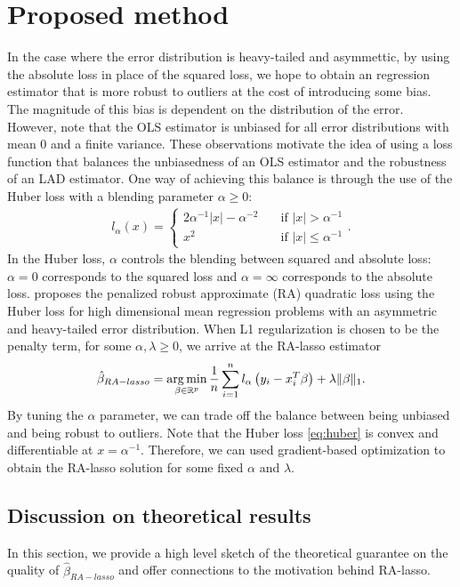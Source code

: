 

\section{Proposed method}\label{sec:method}
In the case where the error distribution is heavy-tailed and asymmettic, by using the absolute loss in place of the squared loss, we hope to obtain an regression estimator that is more robust to outliers at the cost of introducing some bias. The magnitude of this bias is dependent on the distribution of the error. However, note that the OLS estimator is unbiased for all error distributions with mean $0$ and a finite variance. These observations motivate the idea of using a loss function that balances the unbiasedness of an OLS estimator and the robustness of an LAD estimator. One way of achieving this balance is through the use of the Huber loss with a blending parameter $\alpha \geq 0$:
\begin{align}
l_\alpha(x) = 
\begin{cases}
2\alpha^{-1}|x|-\alpha^{-2} \quad &\text{if } |x|>\alpha^{-1} \\
x^2 \quad &\text{if } |x|\leq\alpha^{-1}
\end{cases}. \label{eq:huber}
\end{align}
In the Huber loss, $\alpha$ controls the blending between squared and absolute loss: $\alpha=0$ corresponds to the squared loss and $\alpha=\infty$ corresponds to the absolute loss. \citet{fan2017estimation} proposes the penalized robust approximate (RA) quadratic loss using the Huber loss for high dimensional mean regression problems with an asymmetric and heavy-tailed error distribution. When L1 regularization is chosen to be the penalty term, for some $\alpha,\lambda\geq0$, we arrive at the RA-lasso estimator
\begin{align*}
\hat{\beta}_{RA-lasso} = \argmin_{\beta\in\mathbb{R}^p} \frac{1}{n}\sum_{i=1}^n l_\alpha \left( y_i - x_i^T\beta \right) + \lambda\|\beta\|_1.
\end{align*}
By tuning the $\alpha$ parameter, we can trade off the balance between being unbiased and being robust to outliers. Note that the Huber loss \cref{eq:huber} is convex and differentiable at $x=\alpha^{-1}$. Therefore, we can used gradient-based optimization to obtain the RA-lasso solution for some fixed $\alpha$ and $\lambda$.

\subsection{Discussion on theoretical results}
In this section, we provide a high level sketch of the theoretical guarantee on the quality of $\hat{\beta}_{RA-lasso}$ and offer connections to the motivation behind RA-lasso.

